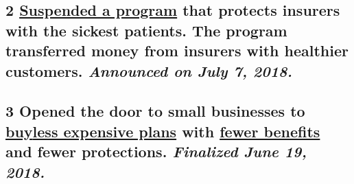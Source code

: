 \hypertarget{2-suspended-a-program-that-protects-insurers-with-the-sickest-patients-the-program-transferred-money-from-insurers-with-healthier-customers-announced-on-july-7-2018}{%
\subsection{\texorpdfstring{\textbf{2}
\href{https://www.nytimes3xbfgragh.onion/2018/07/07/us/politics/trump-risk-adjustment-payments-obamacare.html}{Suspended
a program} that protects insurers with the sickest patients. The program
transferred money from insurers with healthier customers.
\emph{Announced on July 7,
2018.}}{2 Suspended a program that protects insurers with the sickest patients. The program transferred money from insurers with healthier customers. Announced on July 7, 2018.}}\label{2-suspended-a-program-that-protects-insurers-with-the-sickest-patients-the-program-transferred-money-from-insurers-with-healthier-customers-announced-on-july-7-2018}}

\hypertarget{3-opened-the-door-to-small-businesses-to-buyless-expensive-plans-with-fewer-benefits-and-fewer-protections-finalized-june-19-2018}{%
\subsection{\texorpdfstring{\textbf{3} Opened the door to small
businesses to
\href{https://www.nytimes3xbfgragh.onion/2017/10/12/us/politics/trump-obamacare-executive-order-health-insurance.html?hp\&action=click\&pgtype=Homepage\&clickSource=story-heading\&module=first-column-region\&region=top-news\&WT.nav=top-news}{buy}\href{https://www.nytimes3xbfgragh.onion/2017/10/12/us/politics/trump-obamacare-executive-order-health-insurance.html?hp\&action=click\&pgtype=Homepage\&clickSource=story-heading\&module=first-column-region\&region=top-news\&WT.nav=top-news}{less
expensive plans} with
\href{https://www.nytimes3xbfgragh.onion/2018/06/19/us/politics/trump-affordable-care-act-health-insurance.html}{fewer
benefits} and fewer protections. \emph{Finalized June 19,
2018.}}{3 Opened the door to small businesses to buyless expensive plans with fewer benefits and fewer protections. Finalized June 19, 2018.}}\label{3-opened-the-door-to-small-businesses-to-buyless-expensive-plans-with-fewer-benefits-and-fewer-protections-finalized-june-19-2018}}

